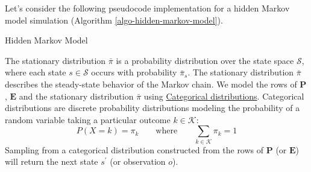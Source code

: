 \documentclass[11pt]{article}
\theoremstyle{definition}
\begin{document}
Let's consider the following pseudocode implementation for a hidden Markov model simulation (Algorithm \ref{algo-hidden-markov-model}).
\begin{algorithm}[H]
    \caption{Hidden Markov Model}\label{algo-hidden-markov-model}
    \begin{algorithmic}[1]

            \Statex
            \EndFor
            \Statex
            \EndFor
        \EndProcedure
    \end{algorithmic}
\end{algorithm}

The stationary distribution $\bar{\pi}$ is a probability distribution over the state space $\mathcal{S}$, where each state $s\in\mathcal{S}$ occurs with probability $\bar{\pi}_{s}$. The stationary distribution $\bar{\pi}$ describes the steady-state behavior of the Markov chain.
We model the rows of $\mathbf{P}$, $\mathbf{E}$ and the stationary distribution $\bar{\pi}$ using \href{https://en.wikipedia.org/wiki/Categorical_distribution}{Categorical distributions}. 
Categorical distributions are discrete probability distributions modeling the probability of a random variable taking a particular outcome $k\in\mathcal{K}$:
\begin{equation}
P(X = k) = \pi_{k}\qquad\text{where}\qquad\sum_{k\in\mathcal{K}}\pi_{k} = 1
\end{equation}
Sampling from a categorical distribution constructed from the rows of $\mathbf{P}$ (or $\mathbf{E}$)
will return the next state $s^{\prime}$ (or observation $o$).
\end{document}
